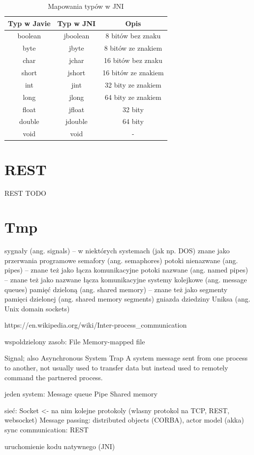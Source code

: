 \begin{table}[h!]
	\centering
	\begin{tabular}{|c c c|}
		\hline
		Typ w Javie & Typ w JNI & Opis \\ [0.5ex]
		\hline\hline
		boolean & jboolean & 8 bitów bez znaku \\
		byte & jbyte & 8 bitów ze znakiem \\
		char & jchar & 16 bitów bez znaku \\
		short & jshort & 16 bitów ze znakiem \\
		int & jint & 32 bity ze znakiem \\
		long & jlong & 64 bity ze znakiem \\
		float & jfloat & 32 bity \\
		double & jdouble & 64 bity \\
		void & void & - \\ [1ex]
		\hline
	\end{tabular}
    \caption{Mapowania typów w JNI}
\end{table}


\section{REST}

REST TODO


\section{Tmp}

sygnały (ang. signals) – w niektórych systemach (jak np. DOS) znane jako przerwania programowe
semafory (ang. semaphores)
potoki nienazwane (ang. pipes) – znane też jako łącza komunikacyjne
potoki nazwane (ang. named pipes) – znane też jako nazwane łącza komunikacyjne
systemy kolejkowe (ang. message queues)
pamięć dzieloną (ang. shared memory) – znane też jako segmenty pamięci dzielonej (ang. shared memory segments)
gniazda dziedziny Uniksa (ang. Unix domain sockets)

https://en.wikipedia.org/wiki/Inter-process\_communication

wspoldzielony zasob:
File
Memory-mapped file

Signal; also Asynchronous System Trap	A system message sent from one process to another, not usually used to transfer data but instead used to remotely command the partnered process.

jeden system:
Message queue
Pipe
Shared memory

sieć:
Socket <- na nim kolejne protokoly (wlasny protokol na TCP, REST, websocket)
Message passing: distributed objects (CORBA), actor model (akka)
sync communication: REST

uruchomienie kodu natywnego (JNI)
